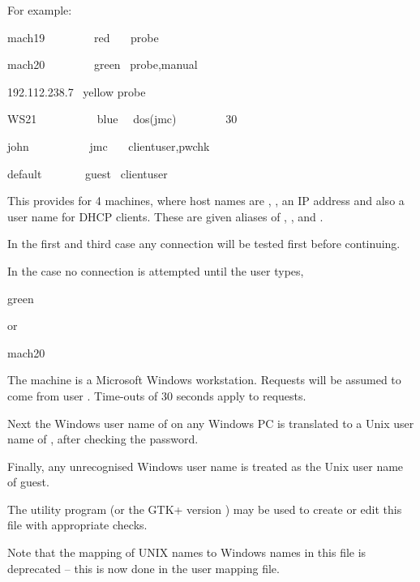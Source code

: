For example:

\begin{expara}

mach19 \ \ \ \ \ \ \ \ red \ \ \ probe

mach20 \ \ \ \ \ \ \ \ green \ probe,manual

192.112.238.7 \ yellow probe

WS21 \ \ \ \ \ \ \ \ \ \ blue \ \ dos(jmc) \ \ \ \ \ \ \ \ 30

john \ \ \ \ \ \ \ \ \ \ jmc \ \ \ clientuser,pwchk

default \ \ \ \ \ \ \ guest \ clientuser

\end{expara}

This provides for 4 machines, where host names are , , 
an IP address and also a user name for DHCP clients. These are given aliases of , ,  and
.

In the first and third case any connection will be tested first before continuing.

In the  case no connection is attempted until the user types,

\begin{expara}

\BtconnName{} green

\end{expara}

or

\begin{expara}

\BtconnName{} mach20

\end{expara}

The  machine is a Microsoft Windows workstation. Requests will be assumed to come from user
. Time-outs of 30 seconds apply to requests.

Next the Windows user name of  on any Windows PC is translated to a Unix user name of ,
after checking the password.

Finally, any unrecognised Windows user name is treated as the Unix user name of guest.

The utility program \PrHostedit{} (or the GTK+ version ) may be used to create or edit this
file with appropriate checks.

Note that the mapping of UNIX names to Windows names in this file is deprecated -- this is now done in the user mapping file.

